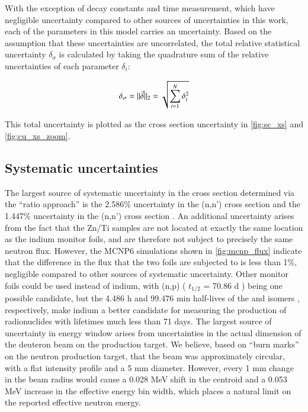 With the exception of decay constants  and time measurement, which have negligible uncertainty compared to other sources of uncertainties in this work, each of the parameters in this model carries an uncertainty.
Based on the assumption that these uncertainties are uncorrelated, the total relative statistical uncertainty $\delta_\sigma$ is calculated by taking the quadrature sum of the relative uncertainties of each parameter  $\delta_i$:

\begin{equation}
\delta_\sigma = \lVert  \vec{\delta}  \rVert_2 = \sqrt{\sum_{i=1}^N  \delta_i^2  }
\end{equation}

This total  uncertainty is plotted as the cross section uncertainty in \autoref{fig:sc_xs} and \autoref{fig:cu_xs_zoom}.



\subsection{Systematic uncertainties}

The largest source of systematic uncertainty in the cross section determined via the \enquote{ratio approach} is the 2.586\% uncertainty in the (n,n')  cross section and the 1.447\% uncertainty in the (n,n')  cross section  \cite{Capote2012,zsolnay2012technical}.
 An additional uncertainty arises from the fact that the Zn/Ti samples are not located at exactly the same location as the indium monitor foils, and are therefore not subject to precisely the same neutron flux.
 However, the MCNP6 simulations shown in \autoref{fig:mcnp_flux} indicate that the difference in the flux that the two foils are subjected to is less than 1\%, negligible compared to other sources of systematic uncertainty.
 Other monitor foils could be used instead of indium, with (n,p) ( $t_{1/2}$ = 70.86 d \cite{Nesaraja2010}) being one possible candidate, but the 4.486 h and 99.476 min half-lives of the  and  isomers \cite{Blachot2012,Blachot2010a}, respectively, make indium a better candidate for measuring the production of radionuclides with lifetimes much less than 71 days.
The largest source of uncertainty in energy window arises from uncertainties in the actual dimension of the deuteron beam on the production target.
 We believe, based on \enquote{burn marks} on the neutron production target, that the beam was approximately circular, with a flat intensity profile and a 5 mm diameter.
 However, every 1 mm change in the beam radius would cause a 0.028 MeV shift in the centroid and a 0.053 MeV increase in the effective energy bin width, which places a natural limit on the reported effective neutron energy.
 

